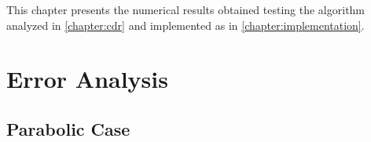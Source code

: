 This chapter presents the numerical results obtained testing the algorithm analyzed in \cref{chapter:cdr} and implemented as in \cref{chapter:implementation}.

\section{Error Analysis}

\newpage
\subsection{Parabolic Case}

\begin{figure}[!ht]
    \begin{subfigure}[t]{0.49\textwidth}
        \centering
        
    \end{subfigure}
    \hfill
    \begin{subfigure}[t]{0.49\textwidth}
        \centering
        
    \end{subfigure}
\end{figure}

\begin{figure}[!ht]
    \begin{subfigure}[t]{0.49\textwidth}
        \centering
        
    \end{subfigure}
    \hfill
    \begin{subfigure}[t]{0.49\textwidth}
        \centering
        
    \end{subfigure}
\end{figure}

\newpage

\begin{figure}[!ht]
    \begin{subfigure}[t]{0.49\textwidth}
        \centering
        
    \end{subfigure}
    \hfill
    \begin{subfigure}[t]{0.49\textwidth}
        \centering
        
    \end{subfigure}
\end{figure}

\begin{figure}[!ht]
    \begin{subfigure}[t]{0.49\textwidth}
        \centering
        
    \end{subfigure}
    \hfill
    \begin{subfigure}[t]{0.49\textwidth}
        \centering
        
    \end{subfigure}
\end{figure}

